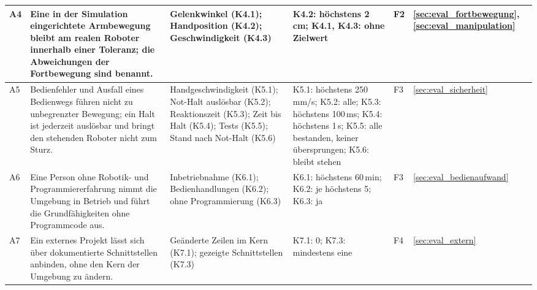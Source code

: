 \begin{table}[htbp]
\begin{tabularx}{\textwidth}{|P{0.8cm}|L|P{3.2cm}|P{3.3cm}|P{1.2cm}|P{1.8cm}|}
        A4 &
        Eine in der Simulation eingerichtete Armbewegung bleibt am realen Roboter innerhalb einer Toleranz; die Abweichungen der Fortbewegung sind benannt. &
        Gelenkwinkel (K4.1); Handposition (K4.2); Geschwindigkeit (K4.3) &
        K4.2: höchstens 2\,cm; %
        K4.1, K4.3: ohne Zielwert &
        F2 &
        \ref{sec:eval_fortbewegung}, \ref{sec:eval_manipulation}\\\hline
        A5 &
        Bedienfehler und Ausfall eines Bedienwegs führen nicht zu unbegrenzter Bewegung; ein Halt ist jederzeit auslösbar und bringt den stehenden Roboter nicht zum Sturz. &
        Handgeschwindigkeit (K5.1); Not-Halt auslösbar (K5.2); Reaktionszeit (K5.3); Zeit bis Halt (K5.4); Tests (K5.5); Stand nach Not-Halt (K5.6) &
        K5.1: höchstens 250\,mm/s; %
        K5.2: alle; K5.3: höchstens 100\,ms; %
        K5.4: höchstens 1\,s; %
        K5.5: alle bestanden, keiner übersprungen; K5.6: bleibt stehen &
        F3 &
        \ref{sec:eval_sicherheit}\\\hline
        A6 &
        Eine Person ohne Robotik- und Programmiererfahrung nimmt die Umgebung in Betrieb und führt die Grundfähigkeiten ohne Programmcode aus. &
        Inbetriebnahme (K6.1); Bedienhandlungen (K6.2); ohne Programmierung (K6.3) &
        K6.1: höchstens 60\,min; %
        K6.2: je höchstens 5; %
        K6.3: ja &
        F3 &
        \ref{sec:eval_bedienaufwand}\\\hline
        A7 &
        Ein externes Projekt lässt sich über dokumentierte Schnittstellen anbinden, ohne den Kern der Umgebung zu ändern. &
        Geänderte Zeilen im Kern (K7.1); gezeigte Schnittstellen (K7.3) &
        K7.1: 0; K7.3: mindestens eine &
        F4 &
        \ref{sec:eval_extern}\\\hline
    \end{tabularx}
\end{table}


